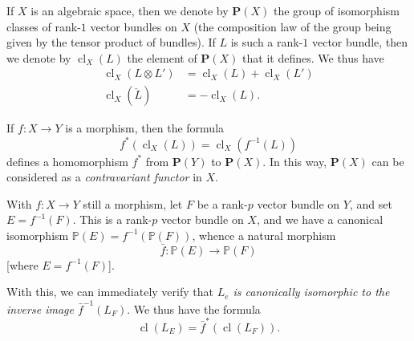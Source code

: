 \documentclass{article}
\newcommand{\oldpage}[1]{\marginpar{\footnotesize$\Big\vert$ \textit{p.~#1}}}
\begin{document}
\oldpage{139}

If \(X\) is an algebraic space, then we denote by \(\mathbf{P}(X)\) the group of isomorphism classes of rank-\(1\) vector bundles on \(X\) (the composition law of the group being given by the tensor product of bundles).
If \(L\) is such a rank-\(1\) vector bundle, then we denote by \(\operatorname{cl}_X(L)\) the element of \(\mathbf{P}(X)\) that it defines.
We thus have
\[
  \begin{aligned}
    \operatorname{cl}_X(L\otimes L') &= \operatorname{cl}_X(L) + \operatorname{cl}_X(L')
  \\\operatorname{cl}_X(\check{L}) &= -\operatorname{cl}_X(L).
  \end{aligned}
\]

If \(f\colon X\to Y\) is a morphism, then the formula
\[
  f^*(\operatorname{cl}_X(L)) = \operatorname{cl}_X(f^{-1}(L))
\]
defines a homomorphism \(f^*\) from \(\mathbf{P}(Y)\) to \(\mathbf{P}(X)\).
In this way, \(\mathbf{P}(X)\) can be considered as a \emph{contravariant functor} in \(X\).

With \(f\colon X\to Y\) still a morphism, let \(F\) be a rank-\(p\) vector bundle on \(Y\), and set \(E=f^{-1}(F)\).
This is a rank-\(p\) vector bundle on \(X\), and we have a canonical isomorphism \(\mathbb{P}(E)=f^{-1}(\mathbb{P}(F))\), whence a natural morphism
\[
  \bar{f}\colon \mathbb{P}(E) \to \mathbb{P}(F)
\]
{[}where \(E=f^{-1}(F)\){]}.

With this, we can immediately verify that \emph{\(L_e\) is canonically isomorphic to the inverse image \(\bar{f}^{-1}(L_F)\)}.
We thus have the formula
\[
  \operatorname{cl}(L_E) = \bar{f}^*(\operatorname{cl}(L_F)).
\]
\end{document}
